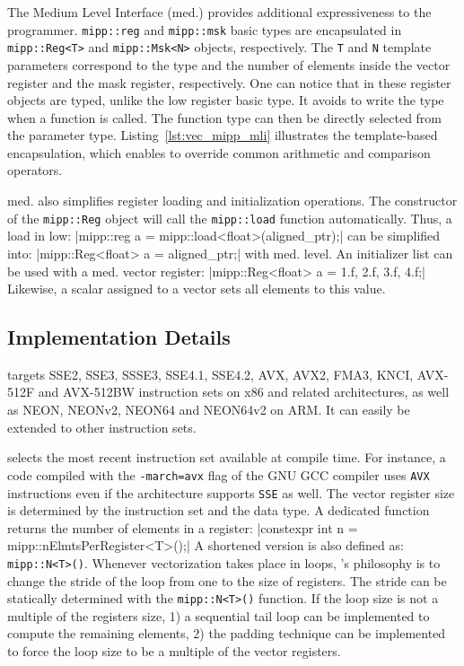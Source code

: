 The \MIPP Medium Level Interface (\MIPP med.) provides additional expressiveness
to the programmer. \verb|mipp::reg| and \verb|mipp::msk| basic types are
encapsulated in \verb|mipp::Reg<T>| and \verb|mipp::Msk<N>| objects,
respectively. The \verb|T| and \verb|N| template parameters correspond to the
type and the number of elements inside the vector register and the mask
register, respectively. One can notice that in these register objects are typed,
unlike the \MIPP low register basic type. It avoids to write the type when a
\MIPP function is called. The function type can then be directly selected from
the parameter type. Listing~\ref{lst:vec_mipp_mli} illustrates the
template-based encapsulation, which enables \MIPP to override common arithmetic
and comparison operators.

\MIPP med. also simplifies register loading and initialization operations. The
constructor of the \verb|mipp::Reg| object will call the \verb|mipp::load|
function automatically. Thus, a load in \MIPP low:
|mipp::reg a = mipp::load<float>(aligned_ptr);|
can be simplified into:
|mipp::Reg<float> a = aligned_ptr;|
with \MIPP med. level. An initializer list
can be used with a \MIPP med. vector register:
|mipp::Reg<float> a = {1.f, 2.f, 3.f, 4.f};|
Likewise, a scalar assigned to a vector sets all elements to
this value.

\subsection{Implementation Details}
\label{sec:vec_mipp_implem}

\MIPP targets SSE2, SSE3, SSSE3, SSE4.1, SSE4.2, AVX, AVX2, FMA3, KNCI, AVX-512F
and AVX-512BW instruction sets on x86 and related architectures, as well as
NEON, NEONv2, NEON64 and NEON64v2 on ARM\R. It can easily be extended to other
instruction sets.

\MIPP selects the most recent instruction set available at compile time. For
instance, a code compiled with the \verb|-march=avx| flag of the GNU GCC
compiler uses \verb|AVX| instructions even if the architecture supports
\verb|SSE| as well. The vector register size is determined by the instruction
set and the data type. A dedicated function returns the number of elements in a
\MIPP register:
|constexpr int n = mipp::nElmtsPerRegister<T>();|
A shortened version is also defined as: \verb|mipp::N<T>()|. Whenever
vectorization takes place in loops, \MIPP's philosophy is to change the stride
of the loop from one to the size of registers. The stride can be statically
determined with the \verb|mipp::N<T>()| function.
If the loop size is not a multiple of the registers size, 1) a sequential tail
loop can be implemented to compute the remaining elements, 2) the padding
technique can be implemented to force the loop size to be a multiple of the
vector registers.

